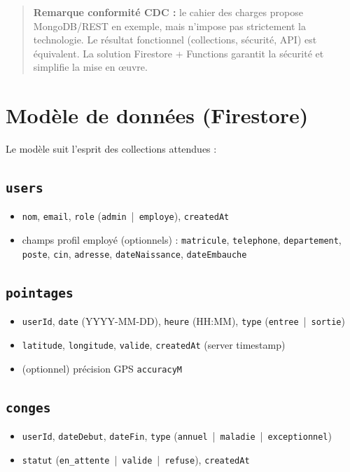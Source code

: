\documentclass[12pt,a4paper]{article}
\begin{document}
\begin{quote}
\textbf{Remarque conformité CDC :} le cahier des charges propose MongoDB/REST en exemple, mais n’impose pas strictement la technologie. Le résultat fonctionnel (collections, sécurité, API) est équivalent. La solution Firestore + Functions garantit la sécurité et simplifie la mise en œuvre.
\end{quote}

\section{Modèle de données (Firestore)}
Le modèle suit l’esprit des collections attendues :

\subsection{\texttt{users}}
\begin{itemize}[leftmargin=*]
  \item \texttt{nom}, \texttt{email}, \texttt{role} (\texttt{admin} \,|\, \texttt{employe}), \texttt{createdAt}
  \item champs profil employé (optionnels) : \texttt{matricule}, \texttt{telephone}, \texttt{departement}, \texttt{poste}, \texttt{cin}, \texttt{adresse}, \texttt{dateNaissance}, \texttt{dateEmbauche}
\end{itemize}

\subsection{\texttt{pointages}}
\begin{itemize}[leftmargin=*]
  \item \texttt{userId}, \texttt{date} (YYYY-MM-DD), \texttt{heure} (HH:MM), \texttt{type} (\texttt{entree} \,|\, \texttt{sortie})
  \item \texttt{latitude}, \texttt{longitude}, \texttt{valide}, \texttt{createdAt} (server timestamp)
  \item (optionnel) précision GPS \texttt{accuracyM}
\end{itemize}

\subsection{\texttt{conges}}
\begin{itemize}[leftmargin=*]
  \item \texttt{userId}, \texttt{dateDebut}, \texttt{dateFin}, \texttt{type} (\texttt{annuel} \,|\, \texttt{maladie} \,|\, \texttt{exceptionnel})
  \item \texttt{statut} (\texttt{en\_attente} \,|\, \texttt{valide} \,|\, \texttt{refuse}), \texttt{createdAt}
\end{itemize}
\end{document}
